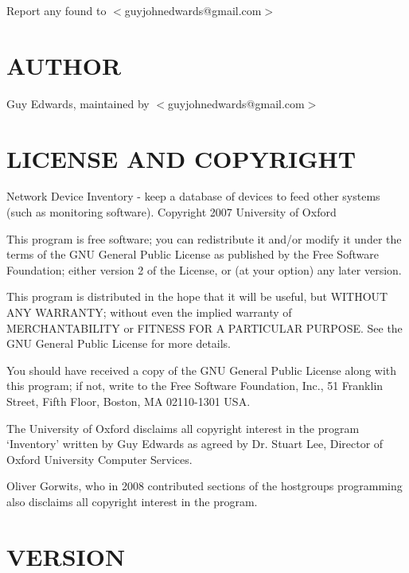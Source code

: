 \documentclass{book}
\begin{document}
Report any found to $<$guyjohnedwards@gmail.com$>$


\section{AUTHOR}
\label{_AUTHOR}
\hypertarget{_AUTHOR}{}



Guy Edwards, maintained by $<$guyjohnedwards@gmail.com$>$


\section{LICENSE AND COPYRIGHT}
\label{_LICENSE_AND_COPYRIGHT}
\hypertarget{_LICENSE_AND_COPYRIGHT}{}



Network Device Inventory - keep a database of devices to feed other systems (such as monitoring software). Copyright 2007 University of Oxford



This program is free software; you can redistribute it and/or modify it under the terms of the GNU General Public License as published by the Free Software Foundation; either version 2 of the License, or (at your option) any later version.



This program is distributed in the hope that it will be useful, but WITHOUT ANY WARRANTY; without even the implied warranty of MERCHANTABILITY or FITNESS FOR A PARTICULAR PURPOSE. See the GNU General Public License for more details.



You should have received a copy of the GNU General Public License along with this program; if not, write to the Free Software Foundation, Inc., 51 Franklin Street, Fifth Floor, Boston, MA 02110-1301 USA.



The University of Oxford disclaims all copyright interest in the program `Inventory' written by Guy Edwards as agreed by Dr. Stuart Lee, Director of Oxford University Computer Services.



Oliver Gorwits, who in 2008 contributed sections of the hostgroups programming also disclaims all copyright interest in the program.




\section{VERSION}
\label{_VERSION}
\hypertarget{_VERSION}{}
\end{document}
